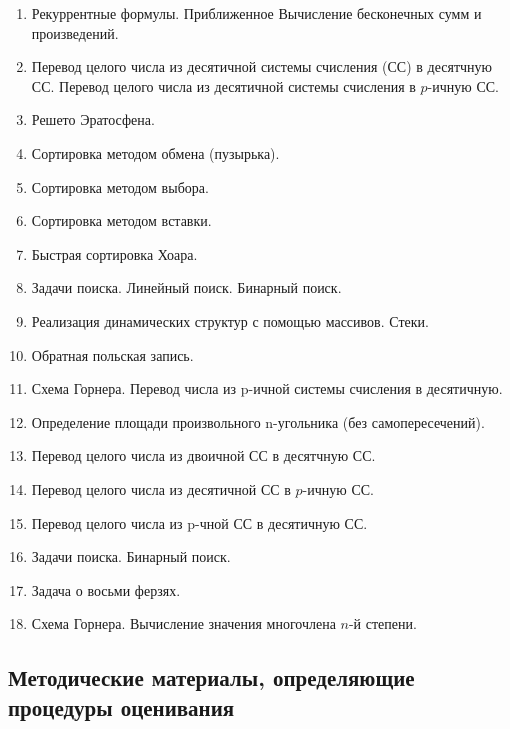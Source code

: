 \documentclass[a4paper,12pt]{article}
\begin{document}
\begin{enumerate}
\item
Рекуррентные формулы. Приближенное Вычисление бесконечных сумм и произведений.
\item
Перевод целого числа из десятичной системы счисления (СС) в десятчную СС. Перевод целого числа из десятичной системы счисления в $p$-ичную СС.
\item
Решето Эратосфена.
\item
Сортировка методом обмена (пузырька).
\item
Сортировка методом выбора.
\item
Сортировка методом вставки.
\item
Быстрая сортировка Хоара.
\item
Задачи поиска. Линейный поиск. Бинарный поиск.
\item
Реализация динамических структур с помощью массивов. Стеки.
\item
Обратная польская запись.
\item
Схема Горнера. Перевод числа из p-ичной системы счисления в десятичную.
\item
Определение площади произвольного n-угольника (без самопересечений).
\item
Перевод целого числа из двоичной СС в десятчную СС.
\item
Перевод целого числа из десятичной СС в $p$-ичную СС.
\item
Перевод целого числа из p-чной СС в десятичную СС.
\item
Задачи поиска. Бинарный поиск.
\item
Задача о восьми ферзях.
\item
Схема Горнера. Вычисление значения многочлена $n$-й степени.
\end{enumerate}



\subsection{Методические материалы, определяющие процедуры оценивания}
\end{document}
